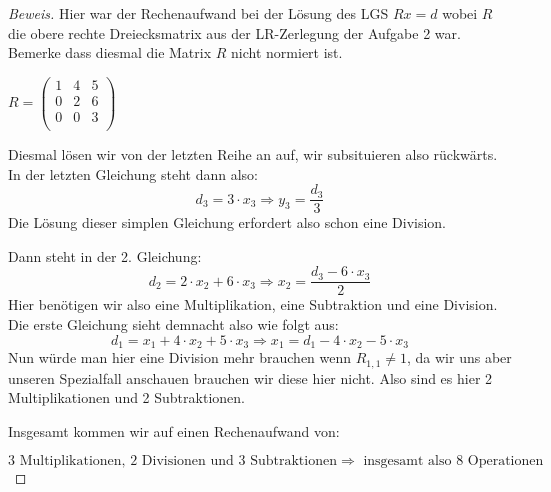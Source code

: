 \documentclass[10pt]{article}
\begin{document}
\begin{proof}[Beweis]
	Hier war der Rechenaufwand bei der Lösung des LGS $Rx = d$ wobei $R$ die obere rechte Dreiecksmatrix
	aus der LR-Zerlegung der Aufgabe 2 war. Bemerke dass diesmal die Matrix $R$ nicht normiert ist.

	\begin{center}
		$R = 
		\begin{pmatrix}
			1 & 4 & 5 \\
			0 & 2 & 6 \\
			0 & 0 & 3 \\
		\end{pmatrix}$
	\end{center}

	Diesmal lösen wir von der letzten Reihe an auf, wir subsituieren also rückwärts.
	In der letzten Gleichung steht dann also:
	$$d_3 = 3 \cdot x_3 \Rightarrow y_3 = \frac{d_3}{3}$$
	Die Lösung dieser simplen Gleichung erfordert also schon eine Division.

	Dann steht in der 2. Gleichung:
	$$d_2 = 2 \cdot x_2 + 6 \cdot x_3 \Rightarrow x_2 = \frac{d_3 - 6 \cdot x_3}{2}$$
	Hier benötigen wir also eine Multiplikation, eine Subtraktion und eine Division.
	Die erste Gleichung sieht demnacht also wie folgt aus:
	$$d_1 = x_1 + 4 \cdot x_2 + 5 \cdot x_3 \Rightarrow x_1 = d_1 - 4 \cdot x_2 - 5 \cdot x_3$$
	Nun würde man hier eine Division mehr brauchen wenn $R_{1,1} \neq 1$, da wir uns aber unseren Spezialfall
	anschauen brauchen wir diese hier nicht. Also sind es hier 2 Multiplikationen und 2 Subtraktionen.

	Insgesamt kommen wir auf einen Rechenaufwand von:
	
	$$3 \text{ Multiplikationen, } 2 \text{ Divisionen und } 3 \text{ Subtraktionen} \Rightarrow \text{ insgesamt also }
	8 \text{ Operationen}$$
\end{proof}
\end{document}
